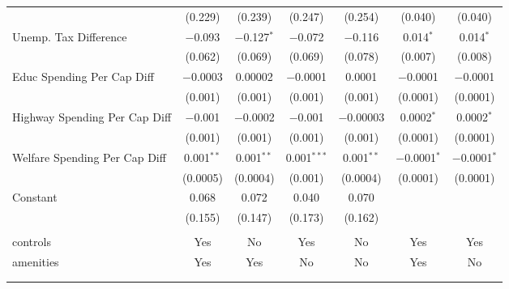 \begin{table}[!htbp]
\begin{tabular}{@{\extracolsep{5pt}}lcccccc}
  & (0.229) & (0.239) & (0.247) & (0.254) & (0.040) & (0.040) \\ 
  Unemp. Tax Difference & $-$0.093 & $-$0.127$^{*}$ & $-$0.072 & $-$0.116 & 0.014$^{*}$ & 0.014$^{*}$ \\ 
  & (0.062) & (0.069) & (0.069) & (0.078) & (0.007) & (0.008) \\ 
  Educ Spending Per Cap Diff & $-$0.0003 & 0.00002 & $-$0.0001 & 0.0001 & $-$0.0001 & $-$0.0001 \\ 
  & (0.001) & (0.001) & (0.001) & (0.001) & (0.0001) & (0.0001) \\ 
  Highway Spending Per Cap Diff & $-$0.001 & $-$0.0002 & $-$0.001 & $-$0.00003 & 0.0002$^{*}$ & 0.0002$^{*}$ \\ 
  & (0.001) & (0.001) & (0.001) & (0.001) & (0.0001) & (0.0001) \\ 
  Welfare Spending Per Cap Diff & 0.001$^{**}$ & 0.001$^{**}$ & 0.001$^{***}$ & 0.001$^{**}$ & $-$0.0001$^{*}$ & $-$0.0001$^{*}$ \\ 
  & (0.0005) & (0.0004) & (0.001) & (0.0004) & (0.0001) & (0.0001) \\ 
  Constant & 0.068 & 0.072 & 0.040 & 0.070 &  &  \\ 
  & (0.155) & (0.147) & (0.173) & (0.162) &  &  \\ 
 \hline \\[-1.8ex] 
controls & Yes & No & Yes & No & Yes & Yes \\ 
amenities & Yes & Yes & No & No & Yes & No \\ 
\hline \\[-1.8ex] 
\hline 
\hline \\[-1.8ex] 
\end{tabular} 
\end{table} 
